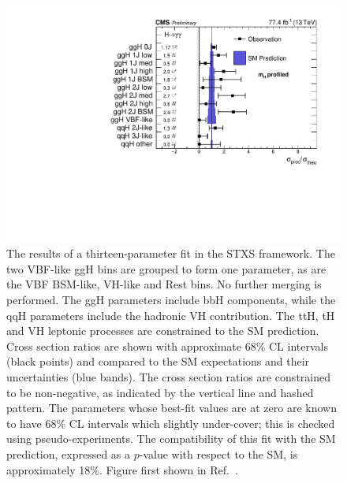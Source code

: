 
\begin{figure}[hptb]
  \centering
  \includegraphics[width=\textwidth]{Figures/Results/Stage1Min.pdf}
  \caption[Results of a thirteen-parameter fit in the STXS framework.]
  {
    The results of a thirteen-parameter fit in the STXS framework. 
    The two VBF-like ggH bins are grouped to form one parameter, 
    as are the VBF BSM-like, VH-like and Rest bins.
    No further merging is performed. 
    The ggH parameters include bbH components, 
    while the qqH parameters include the hadronic VH contribution. 
    The ttH, tH and VH leptonic processes are constrained to the SM prediction. 
    Cross section ratios are shown with approximate 68\% CL intervals (black points) 
    and compared to the SM expectations and their uncertainties (blue bands). 
    The cross section ratios are constrained to be non-negative, 
    as indicated by the vertical line and hashed pattern. 
    The parameters whose best-fit values are at zero are known to have 68\% CL intervals 
    which slightly under-cover; this is checked using pseudo-experiments. 
    The compatibility of this fit with the SM prediction, 
    expressed as a $p$-value with respect to the SM, is approximately 18\%.
    Figure first shown in Ref.~\cite{HIG-18-029}.
  }
  \label{fig:results_stage1min}
\end{figure}

